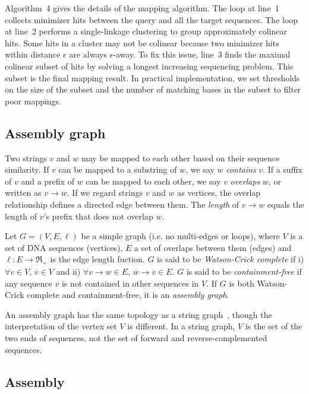 \documentclass{bioinfo}
\begin{document}
\begin{methods}
Algorithm~4 gives the details of the mapping algorithm. The loop at line~1
collects minimizer hits between the query and all the target sequences. The
loop at line~2 performs a single-linkage clustering to group approximately
colinear hits. Some hits in a cluster may not be colinear because two minimizer
hits within distance $\epsilon$ are always $\epsilon$-away. To fix this issue,
line~3 finds the maximal colinear subset of hits by solving a longest
increasing sequencing problem. This subset is the final mapping result. In
practical implementation, we set thresholds on the size of the subset and the
number of matching bases in the subset to filter poor mappings.

\subsection{Assembly graph}

Two strings $v$ and $w$ may be mapped to each other based on their sequence
similarity. If $v$ can be mapped to a substring of $w$, we say $w$
\emph{contains} $v$. If a suffix of $v$ and a prefix of $w$ can be mapped to
each other, we say $v$ \emph{overlaps} $w$, or written as $v\to w$.
If we regard strings $v$ and $w$ as vertices, the overlap relationship defines
a directed edge between them. The \emph{length} of $v\to w$ equals the length
of $v$'s prefix that does not overlap $w$.

Let $G=(V,E,\ell)$ be a simple graph (i.e. no multi-edges or loops), where $V$ is a
set of DNA sequences (vertices), $E$ a set of overlaps between them (edges) and
$\ell:E\to\Re_+$ is the edge length fuction. $G$ is said to be
\emph{Watson-Crick complete} if i) $\forall v\in V$, $\overline{v}\in V$ and
ii) $\forall v\to w\in E$, $\overline{w}\to\overline{v}\in E$. $G$ is said to
be \emph{containment-free} if any sequence $v$ is not contained in other
sequences in $V$. If $G$ is both Watson-Crick complete and containment-free, it
is an \emph{assembly graph}.

An assembly graph has the same topology as a string graph~\citep{Myers:2005bh},
though the interpretation of the vertex set $V$ is different. In a string
graph, $V$ is the set of the two ends of sequences, not the set of forward and
reverse-complemented sequences.

\subsection{Assembly}

\end{methods}


\end{document}
